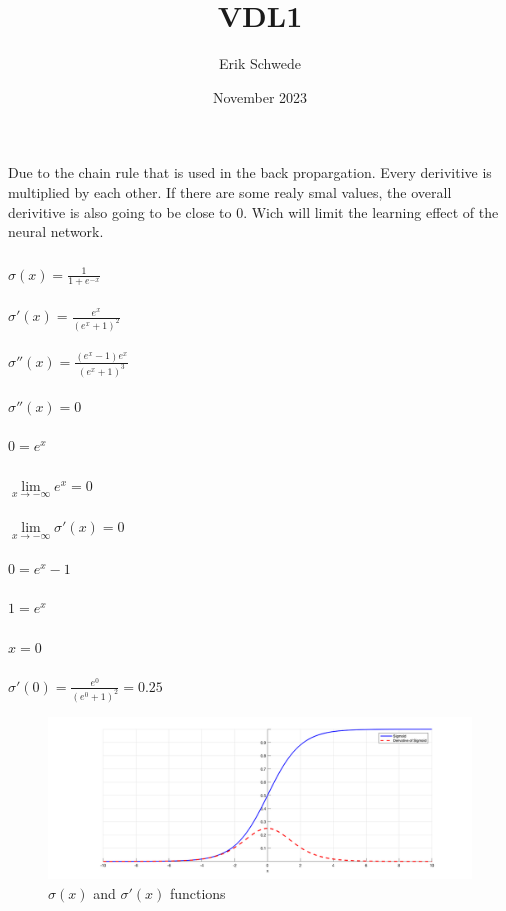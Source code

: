 \documentclass{article}
\title{VDL1}
\author{Erik Schwede}
\date{November 2023}
\begin{document}
\maketitle

\section{}
\subsection{}
\subsection{}
\subsubsection{}
Due to the chain rule that is used in the back propargation. Every derivitive is multiplied by each other. If there are some realy smal values, the overall derivitive is also going to be close to 0. Wich will limit the learning effect of the neural network.
\subsubsection{}
$\sigma(x) = \frac{1}{1 + e^{-x}}$\\\\
$\sigma'(x) = \frac{e^x}{(e^{x} + 1)^2}$\\\\
$\sigma''(x) = \frac{(e^x-1)e^x}{(e^{x} + 1)^3}$\\\\
$\sigma''(x) = 0$\\\\
$0 = e^x$\\\\
$\lim \limits_{x \to -\infty} e^x = 0$\\\\
$\lim \limits_{x \to -\infty} \sigma'(x) = 0$\\\\
$0 = e^x-1$\\\\
$1 = e^x$\\\\
$x = 0$\\\\
$\sigma'(0) = \frac{e^0}{(e^{0} + 1)^2} = 0.25$\\
\begin{figure}[H]
    \centering
    \includegraphics[width=\textwidth]{sigmoid.png}
    \caption{$\sigma(x)$ and $\sigma'(x)$ functions}
\end{figure}
\end{document}
